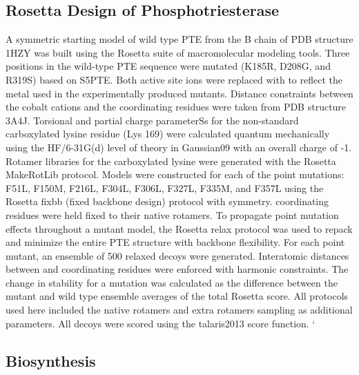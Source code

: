 \begin{refsection}
\subsection{Rosetta Design of Phosphotriesterase}

A symmetric starting model of wild type PTE from the B chain of PDB structure
1HZY\cite{Benning2001a} was built using the Rosetta suite of macromolecular
modeling tools\cite{Leaver-Fay2011}. Three positions in the
wild-type PTE sequence were mutated (K185R, D208G, and R319S) based on
S5PTE\cite{Roodveldt2005}. Both active site  ions were
replaced with  to reflect the metal used in the experimentally
produced mutants.  Distance constraints between the cobalt cations and the
coordinating residues were taken from PDB structure 3A4J\cite{Jackson2009b}.
Torsional and partial charge parameterSs for the non-standard carboxylated
lysine residue (Lys 169) were calculated quantum mechanically using the
HF/6-31G(d) level of theory in Gaussian09\cite{Frisch2009a} with an overall
charge of -1.  Rotamer libraries for the carboxylated lysine were generated
with the Rosetta MakeRotLib\cite{Renfrew2012b} protocol.  Models were
constructed for each of the point mutations: F51L, F150M, F216L, F304L, F306L,
F327L, F335M, and F357L using the Rosetta fixbb (fixed backbone design)
protocol with symmetry\cite{DiMaio2011a}.   coordinating residues
were held fixed to their native rotamers. To propagate point mutation effects
throughout a mutant model, the Rosetta relax protocol was used to repack and
minimize the entire PTE structure with backbone flexibility. For each point
mutant, an ensemble of 500 relaxed decoys were generated. Interatomic distances
between  and coordinating residues were enforced with harmonic
constraints.  The change in stability for a mutation was calculated as the
difference between the mutant and wild type ensemble averages of the total
Rosetta score. All protocols used here included the native rotamers and extra
rotamers sampling as additional parameters. All decoys were scored using the
talaris2013 score function\cite{Leaver-Fay2013a}.
`
\subsection{Biosynthesis}


\end{refsection}
